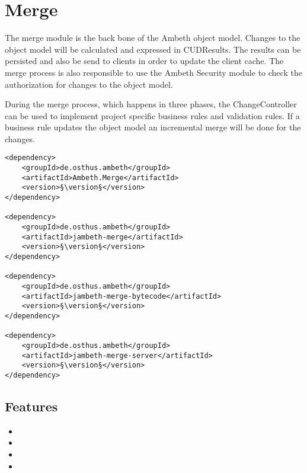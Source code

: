 \section{Merge}
\label{module:Merge}
\ClearAPI
The merge module is the back bone of the Ambeth object model. Changes to the object model will be calculated and expressed in CUDResults. The results can be persisted and also be send to clients in order to update the client cache. The merge process is also responsible to use the Ambeth Security module to check the authorization for changes to the object model.

During the merge process, which happens in three phases, the ChangeController can be used to implement project specific business rules and validation rules. If a business rule updates the object model an incremental merge will be done for the changes.

\TODO

\begin{lstlisting}[style=POM,caption={Maven modules to use \emph{Ambeth Merge}}]
<dependency>
	<groupId>de.osthus.ambeth</groupId>
	<artifactId>Ambeth.Merge</artifactId>
	<version>§\version§</version>
</dependency>

<dependency>
	<groupId>de.osthus.ambeth</groupId>
	<artifactId>jambeth-merge</artifactId>
	<version>§\version§</version>
</dependency>

<dependency>
	<groupId>de.osthus.ambeth</groupId>
	<artifactId>jambeth-merge-bytecode</artifactId>
	<version>§\version§</version>
</dependency>

<dependency>
	<groupId>de.osthus.ambeth</groupId>
	<artifactId>jambeth-merge-server</artifactId>
	<version>§\version§</version>
</dependency>
\end{lstlisting}
\subsection{Features}
\begin{itemize}
	\item {}
	\item {}
	\item {}
	\item {}
\end{itemize}

